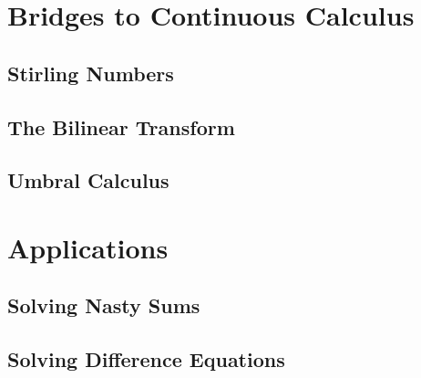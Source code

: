 \section{Bridges to Continuous Calculus}


\subsection{Stirling Numbers}



\subsection{The Bilinear Transform}


\subsection{Umbral Calculus}











\section{Applications}

\subsection{Solving Nasty Sums}

\subsection{Solving Difference Equations}


